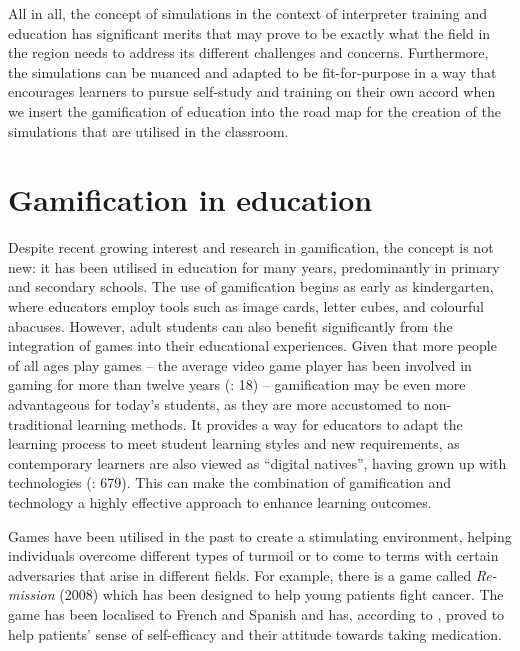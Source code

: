 \documentclass[output=paper]{langscibook}
\begin{document}
All in all, the concept of simulations in the context of interpreter training and education has significant merits that may prove to be exactly what the field in the region needs to address its different challenges and concerns. Furthermore, the simulations can be nuanced and adapted to be fit-for-purpose in a way that encourages learners to pursue self-study and training on their own accord when we insert the gamification of education into the road map for the creation of the simulations that are utilised in the classroom.

\section{Gamification in education}

Despite recent growing interest and research in gamification, the concept is not new: it has been utilised in education for many years, predominantly in primary and secondary schools. The use of gamification begins as early as kindergarten, where educators employ tools such as image cards, letter cubes, and colourful abacuses. However, adult students can also benefit significantly from the integration of games into their educational experiences. Given that more people of all ages play games – the average video game player has been involved in gaming for more than twelve years (\citealt{kapp2012gamification}: 18) – gamification may be even more advantageous for today's students, as they are more accustomed to non-traditional learning methods. It provides a way for educators to adapt the learning process to meet student learning styles and new requirements, as contemporary learners are also viewed as “digital natives”, having grown up with technologies (\citealt{kiryakova2014gamification}: 679). This can make the combination of gamification and technology a highly effective approach to enhance learning outcomes. 

Games have been utilised in the past to create a stimulating environment, helping individuals overcome different types of turmoil or to come to terms with certain adversaries that arise in different fields. For example, there is a game called \textit{Re-mission} (2008) which has been designed to help young patients fight cancer. The game has been localised to French and Spanish and has, according to \citet{tiemann2008remission}, proved to help patients' sense of self-efficacy and their attitude towards taking medication.
\end{document}
